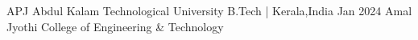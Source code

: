 

\begin{envcvhonors}
  \cvhonor
    {APJ Abdul Kalam Technological University}
    {B.Tech | Kerala,India}
    {Jan 2024}
    {Amal Jyothi College of Engineering \& Technology}
\end{envcvhonors}
